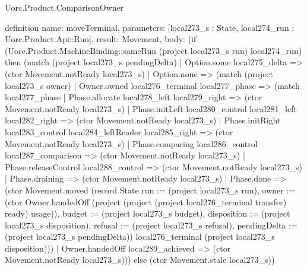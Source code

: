\begin{lexlean}{Uorc.Product.ComparisonOwner}
\begin{semanticmodule}
definition{
  name: moveTerminal,
  parameters: [local273_s : State, local274_run : Uorc.Product.Api::Run],
  result: Movement,
  body: (if (Uorc.Product.MachineBinding::sameRun (project local273_s run) local274_run) then (match (project local273_s pendingDelta)
    | Option.some local275_delta => (ctor Movement.notReady local273_s)
    | Option.none => (match (project local273_s owner)
      | Owner.owned local276_terminal local277_phase => (match local277_phase
        | Phase.allocate local278_left local279_right => (ctor Movement.notReady local273_s)
        | Phase.initLeft local280_control local281_left local282_right => (ctor Movement.notReady local273_s)
        | Phase.initRight local283_control local284_leftReader local285_right => (ctor Movement.notReady local273_s)
        | Phase.comparing local286_control local287_comparison => (ctor Movement.notReady local273_s)
        | Phase.releaseControl local288_control => (ctor Movement.notReady local273_s)
        | Phase.draining => (ctor Movement.notReady local273_s)
        | Phase.done => (ctor Movement.moved (record State {run := (project local273_s run), owner := (ctor Owner.handedOff (project (project (project local276_terminal transfer) ready) usage)), budget := (project local273_s budget), disposition := (project local273_s disposition), refusal := (project local273_s refusal), pendingDelta := (project local273_s pendingDelta)}) local276_terminal (project local273_s disposition)))
      | Owner.handedOff local289_achieved => (ctor Movement.notReady local273_s))) else (ctor Movement.stale local273_s))
}


\end{semanticmodule}
\end{lexlean}
